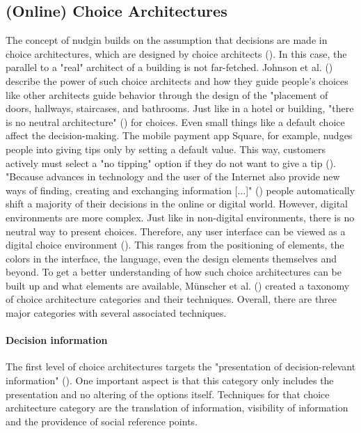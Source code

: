 \subsection{(Online) Choice Architectures}
The concept of nudgin builds on the assumption that decisions are made in choice architectures, which are designed by choice architects (\cite{thaler_nudge:_2009}). In this case, the parallel to a "real" architect of a building is not far-fetched. Johnson et al. (\cite{johnson_beyond_2012}) describe the power of such choice architects and how they guide people's choices like other architects guide behavior through the design of the "placement of doors, hallways, staircases, and bathrooms. Just like in a hotel or building, "there is no neutral architecture" (\cite[p.488]{johnson_beyond_2012}) for choices. Even small things like a default choice affect the decision-making. The mobile payment app Square, for example, nudges people into giving tips only by setting a default value. This way, customers actively must select a "no tipping" option if they do not want to give a tip (\cite{weinmann_digital_2016}). "Because advances in technology and the user of the Internet also provide new ways of finding, creating and exchanging information [...]" (\cite[p.609]{broniarczyk_decision_2014}) people automatically shift a majority of their decisions in the online or digital world. However, digital environments are more complex. Just like in non-digital environments, there is no neutral way to present choices. Therefore, any user interface can be viewed as a digital choice environment (\cite{schneider_digital_2018}). This ranges from the positioning of elements, the colors in the interface, the language, even the design elements themselves and beyond.
To get a better understanding of how such choice architectures can be built up and what elements are available, Münscher et al. (\citeyear{munscher_review_2016}) created a taxonomy of choice architecture categories and their techniques. Overall, there are three major categories with several associated techniques. 
\paragraph{Decision information}
The first level of choice architectures targets the "presentation of decision-relevant information" (\cite[p.514]{munscher_review_2016}). One important aspect is that this category only includes the presentation and no altering of the options itself. Techniques for that choice architecture category are the translation of information, visibility of information and the providence of social reference points.
